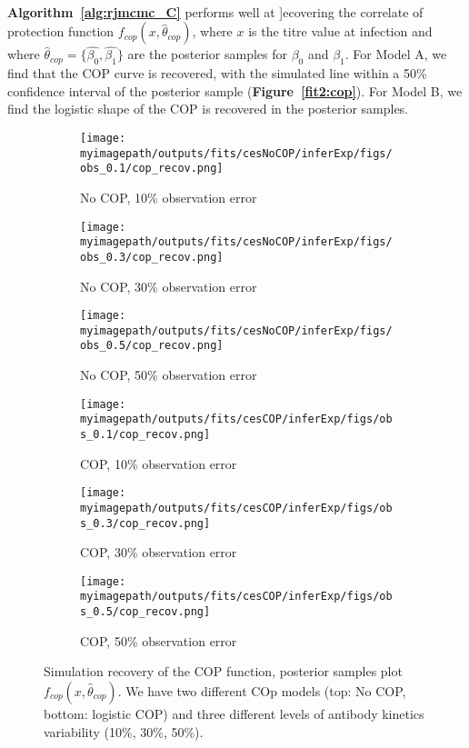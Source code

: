 \documentclass{article}
\newcommand{\myimagepath}{/Users/davidhodgson/Dropbox/Mac (3)/Documents/research/Rpackages/rjmc/}
\begin{document}
\paragraph{} \textbf{Algorithm~\ref{alg:rjmcmc_C}} performs well at ]ecovering the correlate of protection function $f_{cop}(x, \hat{\theta}_{cop})$, where $x$ is the titre value at infection and where $\hat{\theta}_{cop} = \{\hat{\beta_0}, \hat{\beta_1}\}$ are the posterior samples for $\beta_0$ and $\beta_1$. For Model A, we find that the COP curve is recovered, with the simulated line within a 50\% confidence interval of the posterior sample (\textbf{Figure~\ref{fit2:cop}}). For Model B, we find the logistic shape of the COP is recovered in the posterior samples. 

\begin{figure}[H]
\label{fit2:cop}
    \centering
    \begin{subfigure}{0.31\textwidth}
        \centering
        \texttt{[image: \\myimagepath/outputs/fits/cesNoCOP/inferExp/figs/obs\_0.1/cop\_recov.png]}
        \caption{No COP, 10\% observation error}
    \end{subfigure}
    \begin{subfigure}{0.31\textwidth}
        \centering
        \texttt{[image: \\myimagepath/outputs/fits/cesNoCOP/inferExp/figs/obs\_0.3/cop\_recov.png]}
        \caption{No COP, 30\% observation error}
    \end{subfigure}
    \begin{subfigure}{0.31\textwidth}
        \centering
        \texttt{[image: \\myimagepath/outputs/fits/cesNoCOP/inferExp/figs/obs\_0.5/cop\_recov.png]}
        \caption{No COP, 50\% observation error}
    \end{subfigure}
    
  \begin{subfigure}{0.31\textwidth}
        \centering
        \texttt{[image: \\myimagepath/outputs/fits/cesCOP/inferExp/figs/obs\_0.1/cop\_recov.png]}
        \caption{ COP, 10\% observation error}
    \end{subfigure}
    \begin{subfigure}{0.31\textwidth}
        \centering
        \texttt{[image: \\myimagepath/outputs/fits/cesCOP/inferExp/figs/obs\_0.3/cop\_recov.png]}
        \caption{ COP, 30\% observation error}
    \end{subfigure}
    \begin{subfigure}{0.31\textwidth}
        \centering
        \texttt{[image: \\myimagepath/outputs/fits/cesCOP/inferExp/figs/obs\_0.5/cop\_recov.png]}
        \caption{ COP, 50\% observation error}
    \end{subfigure}
    
    \caption{Simulation recovery of the COP function, posterior samples plot  $f_{cop}(x, \hat{\theta}_{cop})$. We have two different COp models (top: No COP, bottom: logistic COP) and three different levels of antibody kinetics variability (10\%, 30\%, 50\%).}
\end{figure}
\end{document}
